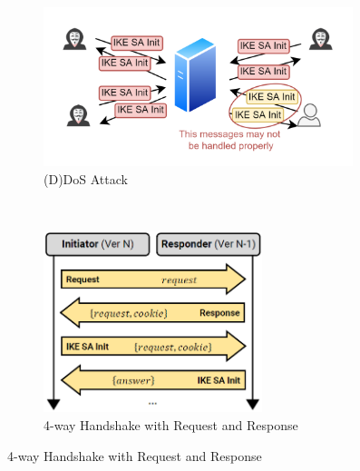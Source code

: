\begin{figure}[H]
\centering
\begin{subfigure}{\textwidth}
  \centering
  \includegraphics[width=0.99\textwidth]{image/ikedos.png}
  \caption{(D)DoS Attack}
  \label{fig:ikedos}
\end{subfigure}\\
\begin{subfigure}{\textwidth}
  \centering
  \includegraphics[width=0.7\textwidth]{image/ikedosprevent.png}
  \caption{4-way Handshake with Request and Response}
  \label{fig:ikedosprev}
\end{subfigure}
\end{figure}
\pagebreak
